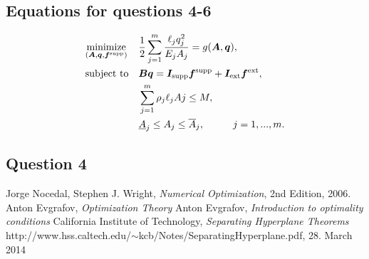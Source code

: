 \documentclass[10pt,a4paper]{article}
\begin{document}
\subsection*{Equations for questions 4-6}

\begin{equation}
 \begin{aligned}
 \label{eq:system6}
 & \underset{(\bm{A},\bm{q},\bm{f}^{\textrm{supp}})}{\text{minimize}}
 & & \frac{1}{2}\sum_{j=1}^{m}\frac{\ell_{j}q_{j}^{2}}{E_{j}A_{j}} = g(\bm{A}, \bm{q}), \\
 & \text{subject to}
 & & \bm{Bq} = \bm{I}_{\textrm{supp}}\bm{f}^{\textrm{supp}} + \bm{I}_{\textrm{ext}}\bm{f}^{\textrm{ext}},\\
 & & & \sum_{j=1}^{m}{\rho_{j}\ell_{j}A{j}} \leq M,\\
 & & & \underline{A}_{j} \leq A_{j} \leq \overline{A}_{j}, \hspace{10 mm}  j = 1,...,m.
 \end{aligned}
\end{equation}








\subsection*{Question 4}







\begin{thebibliography}{}

Jorge Nocedal, Stephen J. Wright, \emph{Numerical Optimization}, 2nd Edition, 2006.
Anton Evgrafov, \emph{Optimization Theory} 
Anton Evgrafov, \emph{Introduction to optimality conditions}
California Institute of Technology, \emph{Separating Hyperplane Theorems} http://www.hss.caltech.edu/$\sim$kcb/Notes/SeparatingHyperplane.pdf, 28. March 2014

\end{thebibliography}
\end{document}
